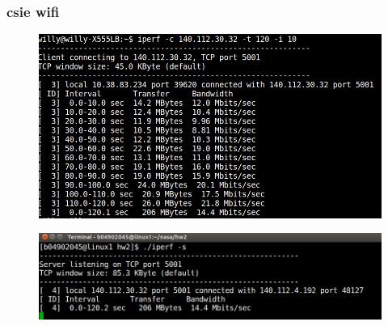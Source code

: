 \documentclass{article}
\begin{document}
        \subsubsection{csie wifi}
            \begin{figure}[!htb]
                \begin{flushleft}
                \includegraphics[scale=0.4]{csie_wifi.png}
                \end{flushleft}
            \end{figure}
            \begin{figure}[!htb]
                \begin{flushleft}
                \includegraphics[scale=0.4]{csie_wifi1.png}
                \end{flushleft}
            \end{figure}
        \newpage
\end{document}
